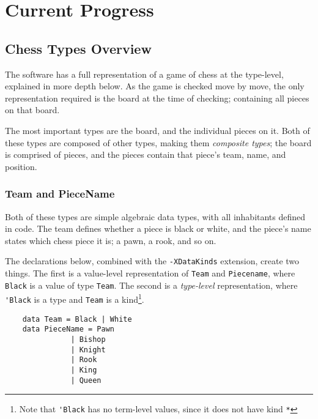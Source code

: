 \documentclass[12pt, a4paper]{scrartcl}
\begin{document}
\section{Current Progress}

\subsection{Chess Types Overview}

The software has a full representation of a game of chess at the type-level, explained in more depth below. As the game is checked move by move, the only representation required is the board at the time of checking; containing all pieces on that board.

The most important types are the board, and the individual pieces on it. Both of these types are composed of other types, making them \emph{composite types}; the board is comprised of pieces, and the pieces contain that piece's team, name, and position.

\subsubsection{Team and PieceName}

Both of these types are simple algebraic data types, with all inhabitants defined in code. The team defines whether a piece is black or white, and the piece's name states which chess piece it is; a pawn, a rook, and so on.

The declarations below, combined with the \lstinline{-XDataKinds} extension, create two things. The first is a value-level representation of \lstinline{Team} and \lstinline{Piecename}, where \lstinline{Black} is a value of type \lstinline{Team}. The second is a \emph{type-level} representation, where \lstinline{'Black} is a type and \lstinline{Team} is a kind\footnote{Note that \lstinline{'Black} has no term-level values, since it does not have kind \lstinline{*}}.


\begin{lstlisting}
    data Team = Black | White
    data PieceName = Pawn
               | Bishop
               | Knight
               | Rook
               | King
               | Queen
\end{lstlisting}
\end{document}
